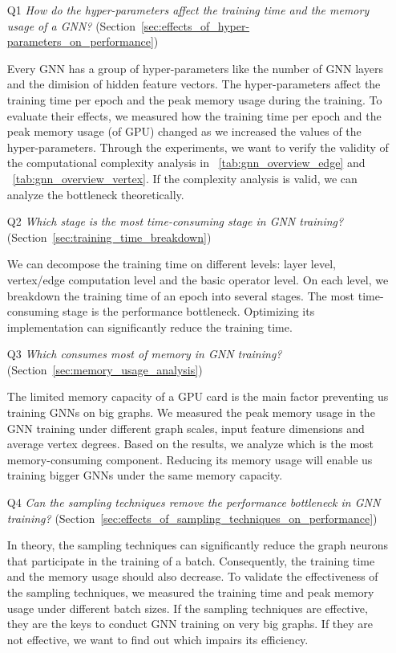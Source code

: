 \begin{itemize}

	\item[Q1] \emph{How do the hyper-parameters affect the training time and the memory usage of a GNN?} (Section~\ref{sec:effects_of_hyper-parameters_on_performance})

	      Every GNN has a group of hyper-parameters like the number of GNN layers and the dimision of hidden feature vectors. The hyper-parameters affect the training time per epoch and the peak memory usage during the training.
	      To evaluate their effects, we measured how the training time per epoch and the peak memory usage (of GPU) changed as we increased the values of the hyper-parameters.
	      Through the experiments, we want to verify the validity of the computational complexity analysis in \tablename~\ref{tab:gnn_overview_edge} and \tablename~\ref{tab:gnn_overview_vertex}.
	      If the complexity analysis is valid, we can analyze the bottleneck theoretically.

	\item[Q2] \emph{Which stage is the most time-consuming stage in GNN training?} (Section~\ref{sec:training_time_breakdown})

	      We can decompose the training time on different levels: layer level, vertex/edge computation level and the basic operator level.
	      On each level, we breakdown the training time of an epoch into several stages. The most time-consuming stage is the performance bottleneck.
	      Optimizing its implementation can significantly reduce the training time.

	\item[Q3] \emph{Which consumes most of memory in GNN training?} (Section~\ref{sec:memory_usage_analysis})

	      The limited memory capacity of a GPU card is the main factor preventing us training GNNs on big graphs.
	      We measured the peak memory usage in the GNN training under different graph scales, input feature dimensions and average vertex degrees.
	      Based on the results, we analyze which is the most memory-consuming component.
	      Reducing its memory usage will enable us training bigger GNNs under the same memory capacity.

	\item[Q4] \emph{Can the sampling techniques remove the performance bottleneck in GNN training?} (Section~\ref{sec:effects_of_sampling_techniques_on_performance})

	      In theory, the sampling techniques can significantly reduce the graph neurons that participate in the training of a batch.
	      Consequently, the training time and the memory usage should also decrease.
	      To validate the effectiveness of the sampling techniques, we measured the training time and peak memory usage under different batch sizes.
	      If the sampling techniques are effective, they are the keys to conduct GNN training on very big graphs.
	      If they are not effective, we want to find out which impairs its efficiency.
\end{itemize}
